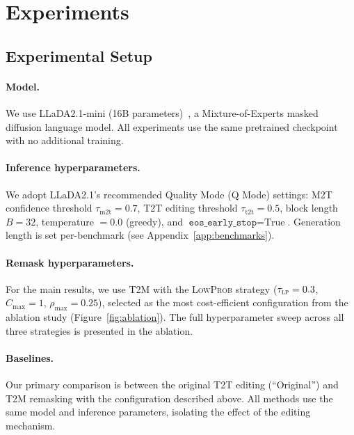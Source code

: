\documentclass{article}
\newcommand{\TtoT}{\textrm{T2T}}
\newcommand{\TtoM}{\textrm{T2M}}
\begin{document}
\section{Experiments}
\label{sec:experiments}

\subsection{Experimental Setup}

\paragraph{Model.} We use LLaDA2.1-mini (16B parameters)~\citep{nie2026llada21}, a Mixture-of-Experts masked diffusion language model. All experiments use the same pretrained checkpoint with no additional training.

\paragraph{Inference hyperparameters.} We adopt LLaDA2.1's recommended Quality Mode (Q Mode) settings: M2T confidence threshold $\tau_{\text{m2t}} = 0.7$, T2T editing threshold $\tau_{\text{t2t}} = 0.5$, block length $B = 32$, temperature $= 0.0$ (greedy), and $\texttt{eos\_early\_stop} = \text{True}$. Generation length is set per-benchmark (see Appendix~\ref{app:benchmarks}).

\paragraph{Remask hyperparameters.} For the main results, we use \TtoM{} with the \textsc{LowProb} strategy ($\tau_{\textsc{lp}} = 0.3$, $C_{\max} = 1$, $\rho_{\max} = 0.25$), selected as the most cost-efficient configuration from the ablation study (Figure~\ref{fig:ablation}). The full hyperparameter sweep across all three strategies is presented in the ablation.

\paragraph{Baselines.} Our primary comparison is between the original \TtoT{} editing (``Original'') and \TtoM{} remasking with the configuration described above. All methods use the same model and inference parameters, isolating the effect of the editing mechanism.
\end{document}

